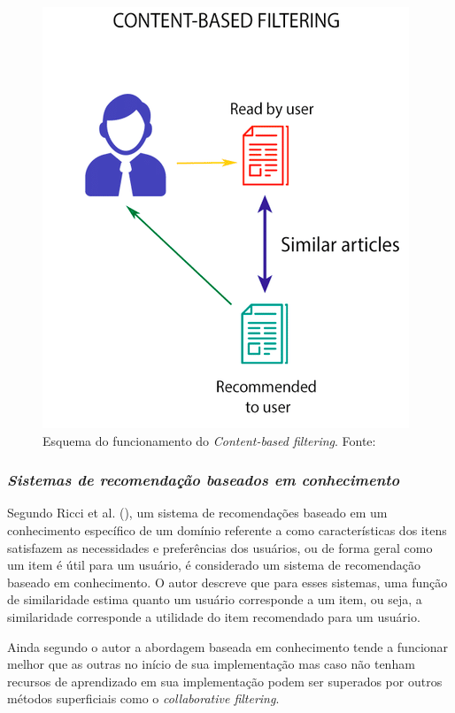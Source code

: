 \begin{figure}[H]
    \centering
    \includegraphics[scale=0.6]{figuras/referencial_teorico/content_based.png}
    \caption[Esquema do funcionamento do Content-based filtering]{Esquema do funcionamento do \textit{Content-based filtering}. Fonte: \cite{Jain:2019}}
    \label{fig:content_based}
\end{figure}

\subsubsection{\textit{Sistemas de recomendação baseados em conhecimento}}

Segundo Ricci et al. (\citeyear{Ricci:2010}), um sistema de recomendações baseado em um conhecimento específico de um domínio referente a como características dos itens satisfazem as necessidades e preferências dos usuários, ou de forma geral como um item é útil para um usuário, é considerado um sistema de recomendação baseado em conhecimento. O autor descreve que para esses sistemas, uma função de similaridade estima quanto um usuário corresponde a um item, ou seja, a similaridade corresponde a utilidade do item recomendado para um usuário.

Ainda segundo o autor a abordagem baseada em conhecimento tende a funcionar melhor que as outras no início de sua implementação mas caso não tenham recursos de aprendizado em sua implementação podem ser superados por outros métodos superficiais como o \textit{collaborative filtering}.

